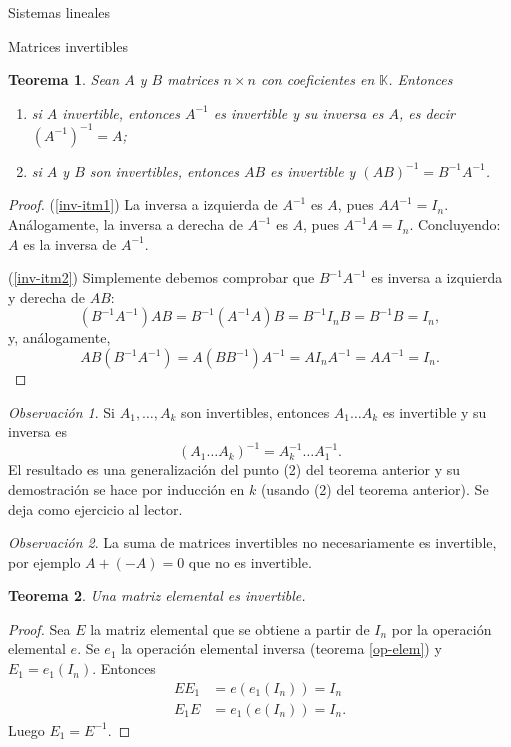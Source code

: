 \documentclass[a4paper,12pt,twoside,spanish]{amsbook}
\newtheorem{teorema}{Teorema}[section]
\theoremstyle{definition}
\theoremstyle{remark}
\newtheorem{observacion}{Observaci\'on}[section]
\newcommand{\K}{\mathbb K}
\begin{document}
\begin{chapter}{Sistemas lineales}
\begin{section}{Matrices invertibles}
			
			
			\begin{teorema}\label{th-prod-inv-impl-inv}
				Sean $A$ y $B$ matrices $n \times n$ con coeficientes en $\K$. Entonces
				\begin{enumerate}
					\item \label{inv-itm1} si $A$ invertible,  entonces $A^{-1}$  es invertible y su inversa es $A$,  es decir $(A^{-1})^{-1}=A$;
					\item \label{inv-itm2} si $A$ y $B$ son invertibles, entonces $AB$ es invertible y $(AB)^{-1} = B^{-1}A^{-1}$.
				\end{enumerate}
			\end{teorema}
				\begin{proof}
					(\ref{inv-itm1}) La inversa a izquierda de $A^{-1}$ es $A$, pues $AA^{-1}=I_n$. Análogamente, la inversa a derecha de $A^{-1}$ es $A$, pues $A^{-1}A = I_n$. Concluyendo: $A$  es la inversa de $A^{-1}$.
					
					(\ref{inv-itm2}) Simplemente debemos comprobar que $B^{-1}A^{-1}$ es inversa a izquierda y derecha de $AB$:
					\begin{equation*}
					(B^{-1}A^{-1})AB = B^{-1}(A^{-1}A)B = B^{-1}I_nB =B^{-1}B = I_n,
					\end{equation*}
					y,  análogamente,
					\begin{equation*}
					AB(B^{-1}A^{-1}) = A(BB^{-1})A^{-1} = AI_nA^{-1} =AA^{-1} = I_n.
					\end{equation*} 
				\end{proof}
			
			
			\begin{observacion}
				Si $A_1,\ldots,A_k$  son invertibles,  entonces $A_1\ldots A_k$ es invertible y su inversa es  $$(A_1\ldots A_k)^{-1} = A_k^{-1}\ldots A_1^{-1} .$$
				El resultado es una generalización del punto (2) del teorema anterior y su demostración se hace por inducción en $k$ (usando (2)  del teorema anterior). Se deja como ejercicio al lector. 
			\end{observacion}
			
			\begin{observacion}
				La suma de matrices invertibles no necesariamente es invertible, por ejemplo $A+ (-A)= 0$ que no es invertible. 
			\end{observacion}	
			
			
			\begin{teorema}\label{th-elmental-impl-invertible}
				Una matriz elemental es invertible.
			\end{teorema}
			\begin{proof}
				Sea $E$ la matriz elemental que se obtiene a partir de $I_n$ por la operación elemental $e$. Se $e_1$ la operación elemental inversa (teorema \ref{op-elem}) y $E_1 = e_1(I_n)$. Entonces 
				\begin{align*}
				EE_1 &= e(e_1(I_n)) = I_n \\
				E_1E &= e_1(e(I_n)) = I_n.
				\end{align*}
				Luego  $E_1 = E^{-1}$. 
			\end{proof}	
			

\end{section}
\end{chapter}
\end{document}
